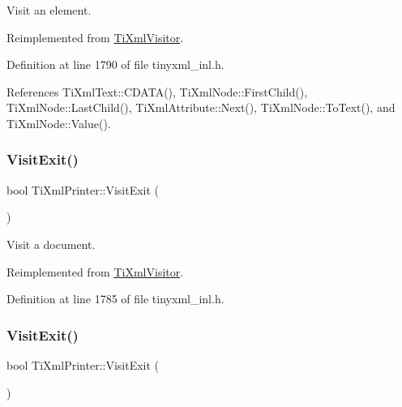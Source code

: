 Visit an element. 



Reimplemented from \hyperlink{class_ti_xml_visitor_af6c6178ffa517bbdba95d70490875fff}{Ti\+Xml\+Visitor}.



Definition at line 1790 of file tinyxml\+\_\+inl.\+h.



References Ti\+Xml\+Text\+::\+C\+D\+A\+T\+A(), Ti\+Xml\+Node\+::\+First\+Child(), Ti\+Xml\+Node\+::\+Last\+Child(), Ti\+Xml\+Attribute\+::\+Next(), Ti\+Xml\+Node\+::\+To\+Text(), and Ti\+Xml\+Node\+::\+Value().

\hypertarget{class_ti_xml_printer_a0a636046fa589b6d7f3e5bd025b3f33e}{}\label{class_ti_xml_printer_a0a636046fa589b6d7f3e5bd025b3f33e} 
\subsubsection{\texorpdfstring{Visit\+Exit()}{VisitExit()}\hspace{0.1cm}{\footnotesize\ttfamily [1/2]}}
{\footnotesize\ttfamily bool Ti\+Xml\+Printer\+::\+Visit\+Exit (\begin{DoxyParamCaption}\item[{const \hyperlink{class_ti_xml_document}{Ti\+Xml\+Document} \&}]{ }\end{DoxyParamCaption})\hspace{0.3cm}{\ttfamily [virtual]}}



Visit a document. 



Reimplemented from \hyperlink{class_ti_xml_visitor_aa0ade4f27087447e93974e975c3246ad}{Ti\+Xml\+Visitor}.



Definition at line 1785 of file tinyxml\+\_\+inl.\+h.

\hypertarget{class_ti_xml_printer_ae6a1df8271df4bf62d7873c38e34aa69}{}\label{class_ti_xml_printer_ae6a1df8271df4bf62d7873c38e34aa69} 
\subsubsection{\texorpdfstring{Visit\+Exit()}{VisitExit()}\hspace{0.1cm}{\footnotesize\ttfamily [2/2]}}
{\footnotesize\ttfamily bool Ti\+Xml\+Printer\+::\+Visit\+Exit (\begin{DoxyParamCaption}\item[{const \hyperlink{class_ti_xml_element}{Ti\+Xml\+Element} \&}]{ }\end{DoxyParamCaption})\hspace{0.3cm}{\ttfamily [virtual]}}




